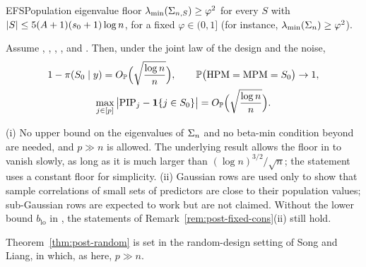 \begin{assumption}{EFS}{Population eigenvalue floor}
$\lambda_{\min}(\Sigma_{n,S})\ge\varphi^2$ for every $S$ with $\lvert S\rvert\le5(A+1)(s_0+1)\log n$, for a fixed $\varphi\in(0,1]$ (for
instance, $\lambda_{\min}(\Sigma_n)\ge\varphi^2$).
\end{assumption}

\begin{theorem}\label{thm:post-random}
Assume , , , ,  and . Then, under the joint law of the design and the noise,
\begin{gather}
  1-\pi(S_0\mid y)=O_{\mathbb{P}}\Big(\sqrt{\frac{\log n}{n}}\Big),\qquad \mathbb{P}\big(\mathrm{HPM}=\mathrm{MPM}=S_0\big)\to1,\label{eq:post-random}\\
  \max_{j\in[p]}\big|\mathrm{PIP}_j-\mathbf{1}\{j\in S_0\}\big|=O_{\mathbb{P}}\Big(\sqrt{\frac{\log n}{n}}\Big).\nonumber
\end{gather}
\end{theorem}


\begin{remark}\label{rem:post-random}
(i) No upper bound on the eigenvalues of $\Sigma_n$ and no beta-min condition beyond  are needed, and $p\gg n$ is
allowed. The underlying result allows the floor in  to vanish slowly, as long as it is much larger than
$(\log n)^{3/2}/\sqrt n$; the statement uses a constant floor for simplicity.
(ii) Gaussian rows are used only to show that sample correlations of small sets of predictors are close to their
population values; sub-Gaussian rows are expected to work but are not claimed. Without the lower bound $b_{\mathrm{lo}}$
in , the statements of Remark~\ref{rem:post-fixed-cons}(ii) still hold.
\end{remark}

\begin{remark}\label{rem:SL-random}
Theorem~\ref{thm:post-random} is set in the random-design setting of Song and Liang, in which, as here, $p\gg n$.
\end{remark}

